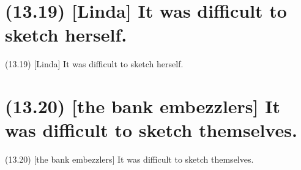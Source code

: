 \documentclass{article}
\begin{document}
\clearpage

%
%

\section*{(13.19) [Linda] It was difficult to sketch herself.}

\bigbreak
\begin{enumerate*}
\item[(13.19)] [Linda] It was difficult to sketch herself.
\end{enumerate*}
\bigbreak

\bigbreak
\begin{minipage}{\textwidth}
\end{minipage}
\bigbreak

\clearpage

%
%

\section*{(13.20) [the bank embezzlers] It was difficult to sketch themselves.}

\bigbreak
\begin{enumerate*}
\item[(13.20)] [the bank embezzlers] It was difficult to sketch themselves.
\end{enumerate*}
\bigbreak
\end{document}
